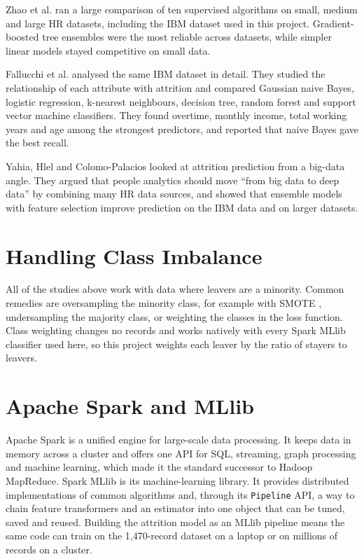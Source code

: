 \documentclass[12pt,a4paper]{report}
\begin{document}
Zhao et al. \cite{zhao2019employee} ran a large comparison of ten supervised algorithms on small, medium and large HR datasets, including the IBM dataset used in this project. Gradient-boosted tree ensembles were the most reliable across datasets, while simpler linear models stayed competitive on small data.

Fallucchi et al. \cite{fallucchi2020predicting} analysed the same IBM dataset in detail. They studied the relationship of each attribute with attrition and compared Gaussian naive Bayes, logistic regression, k-nearest neighbours, decision tree, random forest and support vector machine classifiers. They found overtime, monthly income, total working years and age among the strongest predictors, and reported that naive Bayes gave the best recall.

Yahia, Hlel and Colomo-Palacios \cite{yahia2021big} looked at attrition prediction from a big-data angle. They argued that people analytics should move ``from big data to deep data'' by combining many HR data sources, and showed that ensemble models with feature selection improve prediction on the IBM data and on larger datasets.

\section{Handling Class Imbalance}

All of the studies above work with data where leavers are a minority. Common remedies are oversampling the minority class, for example with SMOTE \cite{chawla2002smote}, undersampling the majority class, or weighting the classes in the loss function. Class weighting changes no records and works natively with every Spark MLlib classifier used here, so this project weights each leaver by the ratio of stayers to leavers.

\section{Apache Spark and MLlib}

Apache Spark \cite{zaharia2016spark} is a unified engine for large-scale data processing. It keeps data in memory across a cluster and offers one API for SQL, streaming, graph processing and machine learning, which made it the standard successor to Hadoop MapReduce. Spark MLlib \cite{meng2016mllib} is its machine-learning library. It provides distributed implementations of common algorithms and, through its \texttt{Pipeline} API, a way to chain feature transformers and an estimator into one object that can be tuned, saved and reused. Building the attrition model as an MLlib pipeline means the same code can train on the 1,470-record dataset on a laptop or on millions of records on a cluster.
\end{document}
